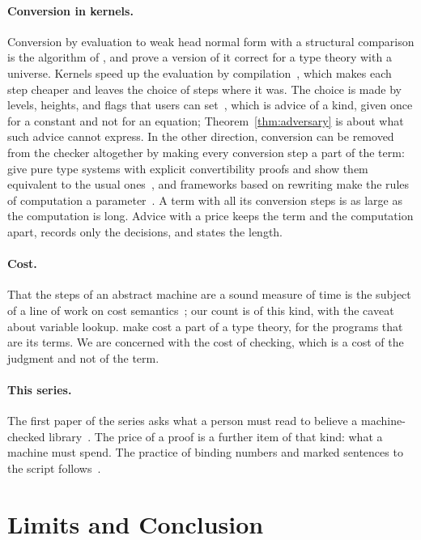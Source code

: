 \documentclass[acmsmall,nonacm,screen]{acmart}
\begin{document}
\paragraph{Conversion in kernels.} Conversion by evaluation to weak head normal form with a
structural comparison is the algorithm of \citet{coquand1996}, and \citet{abel2017} prove a
version of it correct for a type theory with a universe. Kernels speed up the evaluation by
compilation~\cite{gregoire2002,boespflug2011}, which makes each step cheaper and leaves the
choice of steps where it was. The choice is made by levels, heights, and flags that users
can set~\cite{rocqstrategy,bailey2024}, which is advice of a kind, given once for a constant and not for
an equation; Theorem~\ref{thm:adversary} is about what such advice cannot express. In the
other direction, conversion can be removed from the checker altogether by making every
conversion step a part of the term: \citet{vandoorn2013} give pure type systems with
explicit convertibility proofs and show them equivalent to the usual
ones~\cite{adams2006,siles2012}, and frameworks based on rewriting make the rules of
computation a parameter~\cite{cousineau2007}. A term with all its conversion steps is as
large as the computation is long. Advice with a price keeps the term and the computation
apart, records only the decisions, and states the length.

\paragraph{Cost.} That the steps of an abstract machine are a sound measure of time is the
subject of a line of work on cost semantics~\cite{blelloch1996,accattoli2014}; our count is
of this kind, with the caveat about variable lookup. \citet{niu2022} make cost a part of a
type theory, for the programs that are its terms. We are concerned with the cost of checking,
which is a cost of the judgment and not of the term.

\paragraph{This series.} The first paper of the series asks what a person must read to
believe a machine-checked library~\cite{tpp1}. The price of a proof is a further item of
that kind: what a machine must spend. The practice of binding numbers and marked sentences
to the script follows~\cite{tpp10}.

\section{Limits and Conclusion}
\label{sec:limits}
\end{document}
